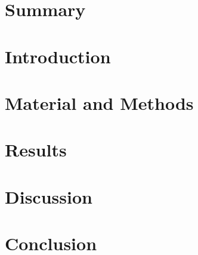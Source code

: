 \section{Summary}

\section{Introduction}


\section{Material and Methods}

 
\section{Results}


\section{Discussion}



\section{Conclusion}


\clearpage
